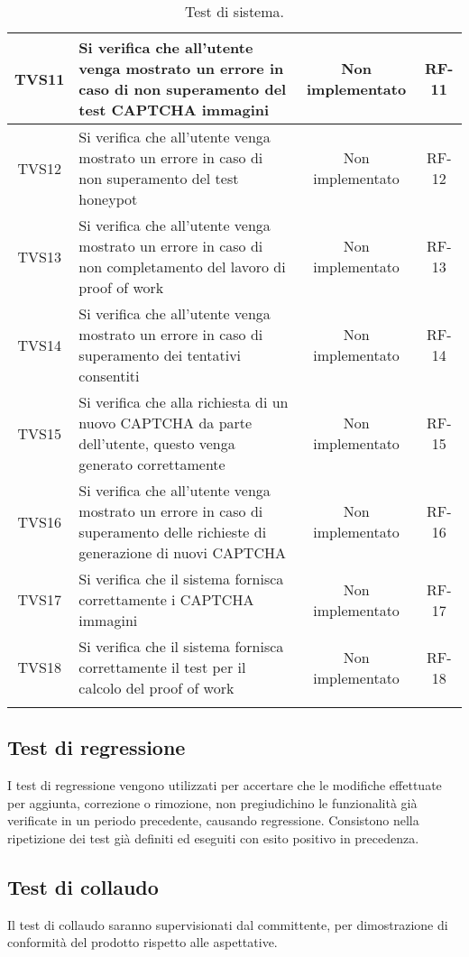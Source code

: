 \begin{center}
\begin{xltabular}{\textwidth}{|c|X|c|c|}
		\hline
		TVS11 & Si verifica che all’utente venga mostrato un errore in caso di non superamento del test CAPTCHA immagini & Non implementato & RF-11\\
		\hline
		TVS12 & Si verifica che all’utente venga mostrato un errore in caso di non superamento del test honeypot & Non implementato & RF-12\\
		\hline
		TVS13 & Si verifica che all’utente venga mostrato un errore in caso di non completamento del lavoro di proof of work & Non implementato & RF-13\\
		\hline
		TVS14 & Si verifica che all’utente venga mostrato un errore in caso di superamento dei tentativi consentiti & Non implementato & RF-14\\
		\hline
		TVS15 & Si verifica che alla richiesta di un nuovo CAPTCHA da parte dell'utente, questo venga generato correttamente & Non implementato & RF-15\\
		\hline
		TVS16 & Si verifica che all’utente venga mostrato un errore in caso di superamento delle richieste di generazione di nuovi CAPTCHA & Non implementato & RF-16\\
		\hline
		TVS17 & Si verifica che il sistema fornisca correttamente i CAPTCHA immagini & Non implementato & RF-17\\
		\hline
		TVS18 & Si verifica che il sistema fornisca correttamente il test per il calcolo del proof of work & Non implementato & RF-18\\
		\hline
		\caption{Test di sistema.}
	\end{xltabular}
\end{center}


\subsection{Test di regressione}
I test di regressione vengono utilizzati per accertare che le modifiche effettuate per aggiunta, correzione o rimozione, non pregiudichino le funzionalità già verificate in un periodo precedente, causando regressione. Consistono nella ripetizione dei test già definiti ed eseguiti con esito positivo in precedenza.

\subsection{Test di collaudo}
Il test di collaudo saranno supervisionati dal committente, per dimostrazione di conformità del prodotto rispetto alle aspettative.
